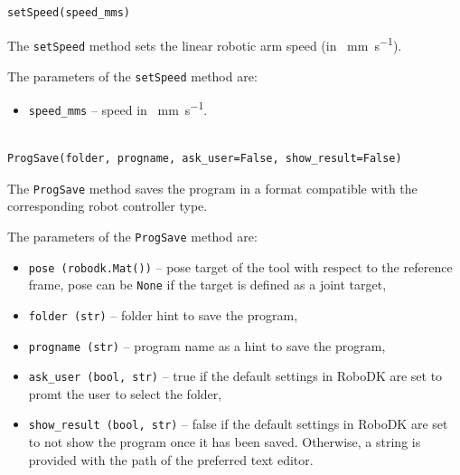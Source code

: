 \begin{verbatim}

setSpeed(speed_mms)

\end{verbatim}

The \texttt{setSpeed} method sets the linear robotic arm speed (in \SI{}{\mm\per\second}).


The parameters of the  \texttt{setSpeed} method are:

\begin{itemize}

\item \texttt{speed_mms} -- speed in \SI{}{\mm\per\second}.

\end{itemize}

\begin{verbatim}

ProgSave(folder, progname, ask_user=False, show_result=False)

\end{verbatim}

The \texttt{ProgSave} method saves the program in a format compatible with the corresponding robot controller type. 

The parameters of the \texttt{ProgSave} method are:

\begin{itemize}

\item \texttt{pose (robodk.Mat())} -- pose target of the tool with respect to the reference frame, pose can be \texttt{None} if the target is defined as a joint target,

\item \texttt{folder (str)} -- folder hint to save the program,

\item \texttt{progname (str)} -- program name as a hint to save the program,

\item \texttt{ask_user (bool, str)} -- true if the default settings in RoboDK are set to promt the user to select the folder, 

\item \texttt{show_result (bool, str)} -- false if the default settings in RoboDK are set to not show the program once it has been saved. Otherwise, a string is provided with the path of the preferred text editor.

\end{itemize}

